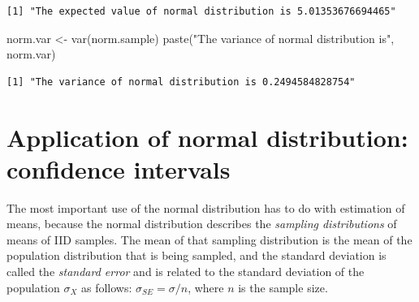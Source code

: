 \documentclass[
  letterpaper,
  DIV=11,
  numbers=noendperiod]{scrreprt}
\newenvironment{Shaded}{\begin{snugshade}}{\end{snugshade}}
\newcommand{\FunctionTok}[1]{\textcolor[rgb]{0.28,0.35,0.67}{#1}}
\newcommand{\NormalTok}[1]{\textcolor[rgb]{0.00,0.23,0.31}{#1}}
\newcommand{\OtherTok}[1]{\textcolor[rgb]{0.00,0.23,0.31}{#1}}
\newcommand{\StringTok}[1]{\textcolor[rgb]{0.13,0.47,0.30}{#1}}
\begin{document}
\begin{verbatim}
[1] "The expected value of normal distribution is 5.01353676694465"
\end{verbatim}

\begin{Shaded}
\begin{Highlighting}[]
\NormalTok{norm.var }\OtherTok{\textless{}{-}} \FunctionTok{var}\NormalTok{(norm.sample)}
\FunctionTok{paste}\NormalTok{(}\StringTok{"The variance of normal distribution is"}\NormalTok{, norm.var)}
\end{Highlighting}
\end{Shaded}

\begin{verbatim}
[1] "The variance of normal distribution is 0.2494584828754"
\end{verbatim}

\hypertarget{application-of-normal-distribution-confidence-intervals}{%
\section{Application of normal distribution: confidence
intervals}\label{application-of-normal-distribution-confidence-intervals}}

The most important use of the normal distribution has to do with
estimation of means, because the normal distribution describes the
\emph{sampling distributions} of means of IID samples. The mean of that
sampling distribution is the mean of the population distribution that is
being sampled, and the standard deviation is called the \emph{standard
error} and is related to the standard deviation of the population
\(\sigma_X\) as follows: \(\sigma_{SE} = \sigma/n\), where \(n\) is the
sample size.
\end{document}
